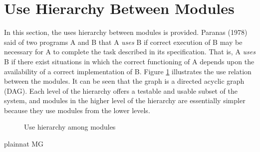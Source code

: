 \documentclass[12pt, titlepage]{article}
\begin{document}
\section{Use Hierarchy Between Modules} \label{SecUse}

In this section, the uses hierarchy between modules is
provided. Paranas (1978) said of two programs A and B that A {\em uses} B if
correct execution of B may be necessary for A to complete the task described in
its specification. That is, A {\em uses} B if there exist situations in which
the correct functioning of A depends upon the availability of a correct
implementation of B.  Figure \ref{FigUH} illustrates the use relation between
the modules. It can be seen that the graph is a directed acyclic graph
(DAG). Each level of the hierarchy offers a testable and usable subset of the
system, and modules in the higher level of the hierarchy are essentially simpler
because they use modules from the lower levels.

\begin{figure}[H]
\centering
\caption{Use hierarchy among modules}
\label{FigUH}
\end{figure}


 {plainnat}
 {MG}
\end{document}
